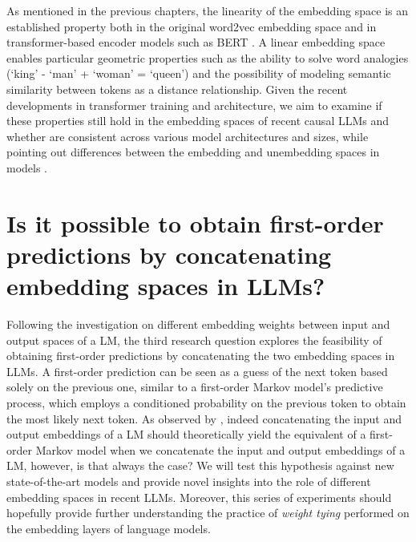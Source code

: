 As mentioned in the previous chapters, the linearity of the embedding space is an established property both in the original word2vec embedding space \cite{mikolov2013} and in transformer-based encoder models such as BERT .
A linear embedding space enables particular geometric properties such as the ability to solve word analogies (`king' - `man' + `woman' = `queen') and the possibility of modeling semantic similarity between tokens as a distance relationship.
Given the recent developments in transformer training and architecture, we aim to examine if these properties still hold in the embedding spaces of recent causal LLMs and whether  are consistent across various model architectures and sizes, while pointing out differences between the embedding and unembedding spaces in models .

\section{Is it possible to obtain first-order predictions by concatenating embedding spaces in LLMs?}

Following the investigation on different embedding weights between input and output spaces of a LM, the third research question explores the feasibility of obtaining first-order predictions by concatenating the two embedding spaces in LLMs.
A first-order prediction can be seen as a guess of the next token based solely on the previous one, similar to a first-order Markov model's predictive process, which employs a conditioned probability on the previous token to obtain the most likely next token.
As observed by , indeed concatenating the input and output embeddings of a LM should theoretically yield the equivalent of a first-order Markov model when we concatenate the input and output embeddings of a LM, however, is that always the case?
We will test this hypothesis against new state-of-the-art models and provide novel insights into the role of different embedding spaces in recent LLMs.
Moreover, this series of experiments should hopefully provide further understanding  the practice of \emph{weight tying}  performed on the embedding layers of language models.